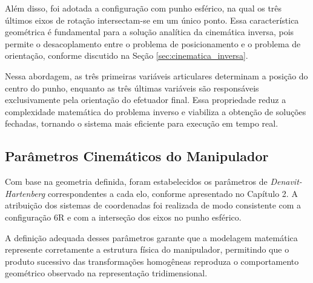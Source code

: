 Além disso, foi adotada a configuração com punho esférico, na qual os três últimos eixos de rotação intersectam-se em um único ponto. Essa característica geométrica é fundamental para a solução analítica da cinemática inversa, pois permite o desacoplamento entre o problema de posicionamento e o problema de orientação, conforme discutido na Seção \ref{sec:cinematica_inversa}.

Nessa abordagem, as três primeiras variáveis articulares determinam a posição do centro do punho, enquanto as três últimas variáveis são responsáveis exclusivamente pela orientação do efetuador final. Essa propriedade reduz a complexidade matemática do problema inverso e viabiliza a obtenção de soluções fechadas, tornando o sistema mais eficiente para execução em tempo real.

%
%
%

\subsection{Parâmetros Cinemáticos do Manipulador}

Com base na geometria definida, foram estabelecidos os parâmetros de \textit{Denavit-Hartenberg} correspondentes a cada elo, conforme apresentado no Capítulo 2. A atribuição dos sistemas de coordenadas foi realizada de modo consistente com a configuração 6R e com a interseção dos eixos no punho esférico.

A definição adequada desses parâmetros garante que a modelagem matemática represente corretamente a estrutura física do manipulador, permitindo que o produto sucessivo das transformações homogêneas reproduza o comportamento geométrico observado na representação tridimensional.

